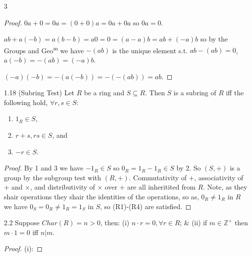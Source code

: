 \documentclass[8pt]{extarticle}
\begin{document}
\begin{multicols}{3}
        \begin{proof}
            \(0a+0=0a=(0+0)a=0a+0a\) so \(0a=0\).
            
            \(ab+a(-b)=a(b-b)=a0=0=(a-a)b=ab+(-a)b\) so by the Groups and Geo\textsuperscript{m} we have \(-(ab)\) is the unique element s.t. \(ab-(ab)=0\), \(a(-b)=-(ab)=(-a)b\).

            \((-a)(-b)=-(a(-b))=-(-(ab))=ab\).
        \end{proof}

        \begin{lemma}{1.18}
            (Subring Test) Let \(R\) be a ring and \(S\subseteq R\). Then \(S\) is a subring of \(R\) iff the following hold, \(\forall r,s\in S\):

            \vspace{-10pt}
            \begin{enumerate}
                \item \(1_R\in S\),
                \vspace{-10pt}
                \item \(r+s,rs\in S\), and 
                \vspace{-10pt}
                \item \(-r\in S\).
            \end{enumerate}
            \vspace{-10pt}
        \end{lemma}

        \begin{proof}
            By 1 and 3 we have \(-1_R\in S\) so \(0_R=1_R-1_R\in S\) by 2. So \((S,+)\) is a group by the subgroup test with \((R,+)\).
            Commutativity of \(+\), associativity of \(+\) and \(\times\), and distributivity of \(\times\) over \(+\) are all inheritited from \(R\).
            Note, as they shair operations they shair the identities of the operations, so as, \(0_R\ne1_R\) in \(R\) we have \(0_S=0_R\ne 1_R=1_S\) in \(S\), so (R1)-(R4) are satisfied.
        \end{proof}

        \begin{lemma}{2.2}
            Suppose \(Char(R)=n>0\), then: (i) \(n\cdot r=0, \forall r\in R\); \& (ii) if \(m\in\mathbb{Z}^+\) then \(m\cdot 1=0\) iff \(n|m\).
        \end{lemma}
        

        \begin{proof}
            (i):


\end{proof}
\end{multicols}
\end{document}
